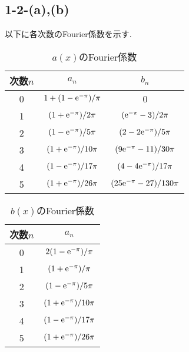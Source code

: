 \subsection*{1-2-(a),(b)}
以下に各次数のFourier係数を示す.
\begin{table}[htbp]
  \caption{$a(x)$のFourier係数}
  \label{tbl:a}
  \centering
  \begin{tabular}{c|cc}
    \hline
    次数$n$ & $a_n$                      & $b_n$                          \\
    \hline \hline
    0       & $1+(1-{\rm e}^{-\pi})/\pi$ & 0                              \\
    1       & $(1+{\rm e}^{-\pi})/2\pi$  & $({\rm e}^{-\pi}-3)/2\pi$      \\
    2       & $(1-{\rm e}^{-\pi})/5\pi$  & $(2-2{\rm e}^{-\pi})/5\pi$     \\
    3       & $(1+{\rm e}^{-\pi})/10\pi$ & $(9{\rm e}^{-\pi}-11)/30\pi$   \\
    4       & $(1-{\rm e}^{-\pi})/17\pi$ & $(4-4{\rm e}^{-\pi})/17\pi$    \\
    5       & $(1+{\rm e}^{-\pi})/26\pi$ & $(25{\rm e}^{-\pi}-27)/130\pi$ \\
    \hline
  \end{tabular}
\end{table}

\begin{table}[htbp]
  \caption{$b(x)$のFourier係数}
  \label{tbl:b}
  \centering
  \begin{tabular}{c|c}
    \hline
    次数$n$ & $a_n$                      \\
    \hline \hline
    0       & $2(1-{\rm e}^{-\pi})/\pi$  \\
    1       & $(1+{\rm e}^{-\pi})/\pi$   \\
    2       & $(1-{\rm e}^{-\pi})/5\pi$  \\
    3       & $(1+{\rm e}^{-\pi})/10\pi$ \\
    4       & $(1-{\rm e}^{-\pi})/17\pi$ \\
    5       & $(1+{\rm e}^{-\pi})/26\pi$ \\
    \hline
  \end{tabular}
\end{table}


